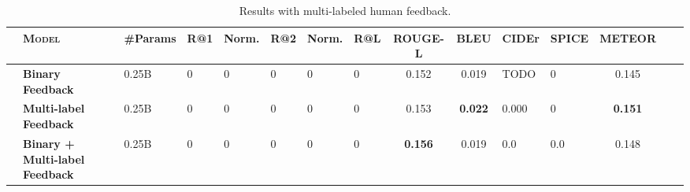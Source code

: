 

\begin{table}[h!]
\centering
\vspace{4mm}
\renewcommand{\arraystretch}{1.15} 
\small
\begin{tabularx}{0.8\linewidth}{l l H HH HH Hc cH Hccc}
\toprule
&
\textsc{Model} & 
\textbf{\#Params} & 
R@1 & \sc Norm. & %
R@2 & \sc Norm. & %
R@L & 
\textbf{ROUGE-L} &
\textbf{BLEU} & 
\textbf{CIDEr} & 
\textbf{SPICE} &
\textbf{METEOR} &
\\ \midrule

& \textbf{Binary Feedback} 
& 0.25B & 0 & 0 & 0 & 0 & 0 & 0.152 & 0.019 & TODO &  0 & 0.145 \\ 

& \textbf{Multi-label Feedback}
& 0.25B & 0 & 0 & 0 & 0 & 0 &   0.153 &  \textbf{0.022} & 0.000  & 0 & \textbf{0.151} \\ 
& \textbf{Binary + Multi-label Feedback}
& 0.25B & 0 & 0 & 0 & 0 & 0 &  \textbf{0.156} &  0.019 & 0.0  & 0.0 & 0.148 \\ 

\bottomrule
\end{tabularx}
\caption{%
Results with multi-labeled human feedback.
}
\label{table:results-comparison-multihf}
\end{table}





